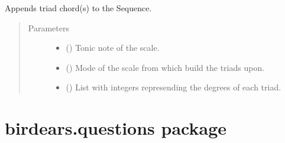 \documentclass[letterpaper,10pt,english]{sphinxmanual}
\begin{document}
\begin{fulllineitems}
\begin{fulllineitems}
\label{\detokenize{index:birdears.sequence.Sequence.make_chord_progression}}
\sphinxAtStartPar
Appends triad chord(s) to the Sequence.
\begin{quote}\begin{description}
\item[{Parameters}] \leavevmode\begin{itemize}
\item {} 
\sphinxAtStartPar
{} () \textendash{} Tonic note of the scale.

\item {} 
\sphinxAtStartPar
{} () \textendash{} Mode of the scale from which build the triads upon.

\item {} 
\sphinxAtStartPar
{} () \textendash{} List with integers represending the degrees
of each triad.

\end{itemize}

\end{description}\end{quote}

\end{fulllineitems}


\begin{fulllineitems}
\label{\detokenize{index:birdears.sequence.Sequence.play}}
\end{fulllineitems}


\end{fulllineitems}



\chapter{birdears.questions package}
\label{\detokenize{index:module-birdears.questions}}\label{\detokenize{index:birdears-questions-package}}
\end{document}
